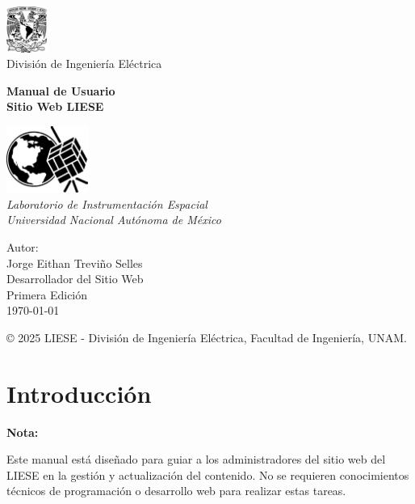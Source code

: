 \documentclass[12pt,letterpaper]{report}
\newenvironment{note}
    {\begin{mdframed}[linecolor=note-blue,linewidth=2pt,backgroundcolor=note-blue!10]
    \textbf{Nota:}\par}
    {\end{mdframed}}
\begin{document}
\begin{titlepage}
    \centering
    \vspace*{1cm}
    
    \includegraphics[width=0.1\textwidth]{images/unam.png}\\[1.2cm]
    
    {\Large División de Ingeniería Eléctrica}
    
    
    {\Huge\bfseries Manual de Usuario\\[0.5cm] 
    Sitio Web LIESE\\[1.5cm]}
    
    \includegraphics[width=0.2\textwidth]{images/logo.png}\\[1.5cm]
    
    {\Large\itshape Laboratorio de Instrumentación Espacial\\[0.3cm]
    Universidad Nacional Autónoma de México\\[1cm]}
    
    {\large Autor:\\
    Jorge Eithan Treviño Selles\\[0.3cm]
    Desarrollador del Sitio Web}\\[1cm]
    
    {\large Primera Edición\\
    \today}
    
    \vfill
    
    {\small © 2025 LIESE - División de Ingeniería Eléctrica, Facultad de Ingeniería, UNAM.}
\end{titlepage}
\newpage

\tableofcontents
\newpage

\chapter{Introducción}

\begin{note}
Este manual está diseñado para guiar a los administradores del sitio web del LIESE en la gestión y actualización del contenido. No se requieren conocimientos técnicos de programación o desarrollo web para realizar estas tareas.
\end{note}
\end{document}
